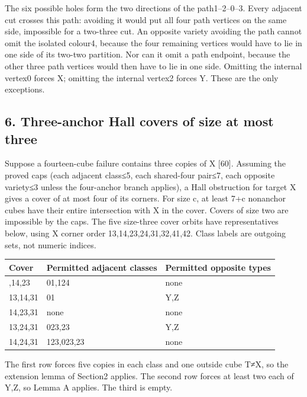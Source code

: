 \documentclass[
  10pt,
]{article}
\begin{document}
The six possible holes form the two directions of the path1--2--0--3.
Every adjacent cut crosses this path: avoiding it would put all four
path vertices on the same side, impossible for a two-three cut. An
opposite variety avoiding the path cannot omit the isolated colour4,
because the four remaining vertices would have to lie in one side of its
two-two partition. Nor can it omit a path endpoint, because the other
three path vertices would then have to lie in one side. Omitting the
internal vertex0 forces X; omitting the internal vertex2 forces Y. These
are the only exceptions.

\hypertarget{three-anchor-hall-covers-of-size-at-most-three}{%
\subsection*{6. Three-anchor Hall covers of size at most
three}\label{three-anchor-hall-covers-of-size-at-most-three}}

Suppose a fourteen-cube failure contains three copies of X {[}60{]}.
Assuming the proved caps (each adjacent class≤5, each shared-four
pair≤7, each opposite variety≤3 unless the four-anchor branch applies),
a Hall obstruction for target X gives a cover of at most four of its
corners. For size c, at least 7+c nonanchor cubes have their entire
intersection with X in the cover. Covers of size two are impossible by
the caps. The five size-three cover orbits have representatives below,
using X corner order 13,14,23,24,31,32,41,42. Class labels are outgoing
sets, not numeric indices.

\begin{longtable}[]{@{}lll@{}}
\toprule\noalign{}
Cover & Permitted adjacent classes & Permitted opposite types \\
\midrule\noalign{}
\endhead
\bottomrule\noalign{}
\endlastfoot
13,14,23 & 01,124 & none \\
13,14,31 & 01 & Y,Z \\
14,23,31 & none & none \\
13,24,31 & 023,23 & Y,Z \\
14,24,31 & 123,023,23 & none \\
\end{longtable}

The first row forces five copies in each class and one outside cube T≠X,
so the extension lemma of Section2 applies. The second row forces at
least two each of Y,Z, so Lemma A applies. The third is empty.
\end{document}
